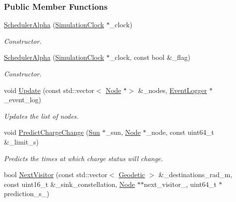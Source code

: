 \subsubsection*{Public Member Functions}
\begin{DoxyCompactItemize}
\item 
\hyperlink{classosse_1_1collaborate_1_1_scheduler_alpha_abf962f131875a1091699fe16a4d0eeb8}{Scheduler\+Alpha} (\hyperlink{classosse_1_1collaborate_1_1_simulation_clock}{Simulation\+Clock} $\ast$\+\_\+clock)
\begin{DoxyCompactList}\small\item\em Constructor. \end{DoxyCompactList}\item 
\hyperlink{classosse_1_1collaborate_1_1_scheduler_alpha_aa3604fc73769a5c09280588532728409}{Scheduler\+Alpha} (\hyperlink{classosse_1_1collaborate_1_1_simulation_clock}{Simulation\+Clock} $\ast$\+\_\+clock, const bool \&\+\_\+flag)
\begin{DoxyCompactList}\small\item\em Constructor. \end{DoxyCompactList}\item 
void \hyperlink{classosse_1_1collaborate_1_1_scheduler_alpha_a375c441e048ff73c2d97816d9c9cb29e}{Update} (const std\+::vector$<$ \hyperlink{classosse_1_1collaborate_1_1_node}{Node} $\ast$$>$ \&\+\_\+nodes, \hyperlink{classosse_1_1collaborate_1_1_event_logger}{Event\+Logger} $\ast$\+\_\+event\+\_\+log)
\begin{DoxyCompactList}\small\item\em Updates the list of nodes. \end{DoxyCompactList}\item 
void \hyperlink{classosse_1_1collaborate_1_1_scheduler_alpha_a78709b9ddc8f6dd9b380432f6deedbb1}{Predict\+Charge\+Change} (\hyperlink{classosse_1_1collaborate_1_1_sun}{Sun} $\ast$\+\_\+sun, \hyperlink{classosse_1_1collaborate_1_1_node}{Node} $\ast$\+\_\+node, const uint64\+\_\+t \&\+\_\+limit\+\_\+s)
\begin{DoxyCompactList}\small\item\em Predicts the times at which charge status will change. \end{DoxyCompactList}\item 
bool \hyperlink{classosse_1_1collaborate_1_1_scheduler_alpha_ab757ae48c70b3409beb483d977bd62f5}{Next\+Visitor} (const std\+::vector$<$ \hyperlink{classosse_1_1collaborate_1_1_geodetic}{Geodetic} $>$ \&\+\_\+destinations\+\_\+rad\+\_\+m, const uint16\+\_\+t \&\+\_\+sink\+\_\+constellation, \hyperlink{classosse_1_1collaborate_1_1_node}{Node} $\ast$$\ast$next\+\_\+visitor\+\_\+, uint64\+\_\+t $\ast$prediction\+\_\+s\+\_\+)

\end{DoxyCompactItemize}
